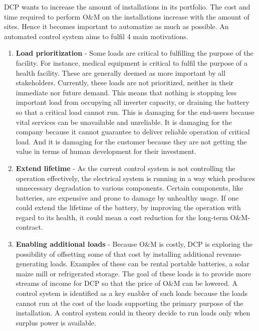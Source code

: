 DCP wants to increase the amount of installations in its portfolio. The cost and time required to perform O\&M on the installations increase with the amount of sites. Hence it becomes important to automatize as much as possible. An automated control system aims to fulfil 4 main motivations.\\

\begin{enumerate}
    \item \textbf{Load prioritization}  -    Some loads are critical to fulfilling the purpose of the facility. For instance, medical equipment is critical to fulfil the purpose of a health facility. These are generally deemed as more important by all stakeholders. Currently, these loads are not prioritized, neither in their immediate nor future demand. This means that nothing is stopping less important load from occupying all inverter capacity, or draining the battery so that a critical load cannot run. This is damaging for the end-users because vital services can be unavailable and unreliable. It is damaging for the company because it cannot guarantee to deliver reliable operation of critical load. And it is damaging for the customer because they are not getting the value in terms of human development for their investment.
    \item \textbf{Extend lifetime}  -   As the current control system is not controlling the operation effectively, the electrical system is running in a way which produces unnecessary degradation to various components. Certain components, like batteries, are expensive and prone to damage by unhealthy usage. If one could extend the lifetime of the battery, by improving the operation with regard to its health, it could mean a cost reduction for the long-term O\&M-contract.
    \item \textbf{Enabling additional loads}    -   Because O\&M is costly, DCP is exploring the possibility of offsetting some of that cost by installing additional revenue-generating loads. Examples of these can be rental portable batteries, a solar maize mill or refrigerated storage. The goal of these loads is to provide more streams of income for DCP so that the price of O\&M can be lowered. A control system is identified as a key enabler of such loads because the loads cannot run at the cost of the loads supporting the primary purpose of the installation. A control system could in theory decide to run loads only when surplus power is available.

\end{enumerate}
